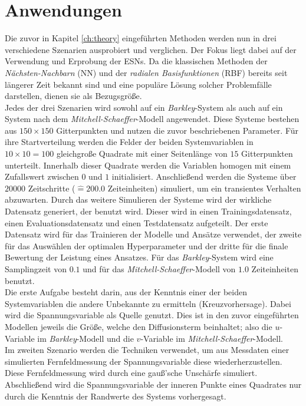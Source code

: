 \chapter{Anwendungen}
\label{ch:experiments}
Die zuvor in Kapitel \ref{ch:theory} eingeführten Methoden werden nun in drei verschiedene Szenarien ausprobiert und verglichen. Der Fokus liegt dabei auf der Verwendung und Erprobung der \textsc{ESN}s. Da die klassischen Methoden der \textit{Nächsten-Nachbarn} (\textsc{NN}) und der \textit{radialen Basisfunktionen} (\textsc{RBF}) bereits seit längerer Zeit bekannt sind und eine populäre Lösung solcher Problemfälle darstellen, dienen sie als Bezugsgröße.\\

Jedes der drei Szenarien wird sowohl auf ein \textit{Barkley}-System als auch auf ein System nach dem \textit{Mitchell-Schaeffer}-Modell angewendet. Diese Systeme bestehen aus $150 \times 150$ Gitterpunkten und nutzen die zuvor beschriebenen Parameter. Für ihre Startverteilung werden die Felder der beiden Systemvariablen in $10 \times 10 = 100$ gleichgroße Quadrate mit einer Seitenlänge von $15$ Gitterpunkten unterteilt. Innerhalb dieser Quadrate werden die Variablen homogen mit einem Zufallswert zwischen $0$ und $1$ initialisiert. Anschließend werden die Systeme über $20000$ Zeitschritte ($\widehat{=} 200.0$ Zeiteinheiten) simuliert, um ein transientes Verhalten abzuwarten. Durch das weitere Simulieren der Systeme wird der wirkliche Datensatz generiert, der benutzt wird. Dieser wird in einen Trainingsdatensatz, einen Evaluationsdatensatz und einen Testdatensatz aufgeteilt. Der erste Datensatz wird für das Trainieren der Modelle und Ansätze verwendet, der zweite für das Auswählen der optimalen Hyperparameter und der dritte für die finale Bewertung der Leistung eines Ansatzes. Für das \textit{Barkley}-System wird eine Samplingzeit von $0.1$ und für das \textit{Mitchell-Schaeffer}-Modell von $1.0$ Zeiteinheiten benutzt.\\
 
Die erste Aufgabe besteht darin, aus der Kenntnis einer der beiden Systemvariablen die andere Unbekannte zu ermitteln (Kreuzvorhersage). Dabei wird die Spannungsvariable als Quelle genutzt. Dies ist in den zuvor eingeführten Modellen jeweils die Größe, welche den Diffusionsterm beinhaltet; also die $u$-Variable im \textit{Barkley}-Modell und die $v$-Variable im \textit{Mitchell-Schaeffer}-Modell.\\
Im zweiten Szenario werden die Techniken verwendet, um aus Messdaten einer simulierten Fernfeldmessung der Spannungsvariable  diese wiederherzustellen. Diese Fernfeldmessung wird durch eine gauß'sche Unschärfe simuliert.\\
Abschließend wird die Spannungsvariable der inneren Punkte eines Quadrates nur durch die Kenntnis der Randwerte des Systems vorhergesagt.\\

